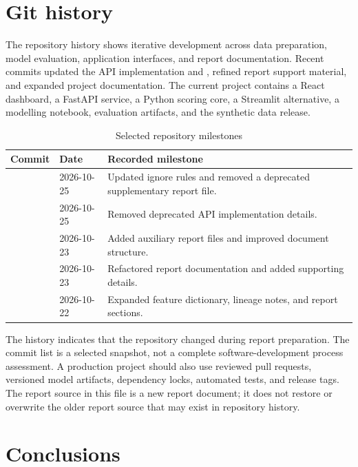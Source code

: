 \chapter{Git history}
\label{chap:git}
The repository history shows iterative development across data
preparation, model evaluation, application interfaces, and report
documentation. Recent commits updated the API implementation and
, refined report support material, and expanded
project documentation. The current project contains a React
dashboard, a FastAPI service, a Python scoring core, a Streamlit
alternative, a modelling notebook, evaluation artifacts, and the
synthetic data release.

\begin{table}[H]
\centering
\tablefont
\caption{Selected repository milestones}
\label{tab:git-history}
\begin{tabularx}{\textwidth}{|p{}|p{}|Y|}
\hline
\textbf{Commit} & \textbf{Date} & \textbf{Recorded milestone}\\\hline
{} & 2026-10-25 & Updated ignore rules and removed a deprecated supplementary report file.\\\hline
{} & 2026-10-25 & Removed deprecated API implementation details.\\\hline
{} & 2026-10-23 & Added auxiliary report files and improved document structure.\\\hline
{} & 2026-10-23 & Refactored report documentation and added supporting details.\\\hline
{} & 2026-10-22 & Expanded feature dictionary, lineage notes, and report sections.\\\hline
\end{tabularx}
\end{table}

The history indicates that the repository changed during report
preparation. The commit list is a selected snapshot, not a complete
software-development process assessment. A production project should
also use reviewed pull requests, versioned model artifacts, dependency
locks, automated tests, and release tags. The report source in this
file is a new report document; it does not restore or overwrite the
older report source that may exist in repository history.

\chapter{Conclusions}
\label{chap:conclusion}

